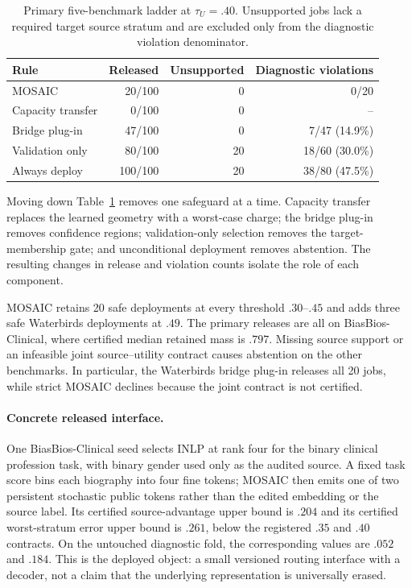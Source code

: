 \begin{table}[t]
\centering
\scriptsize
\setlength{\tabcolsep}{3.4pt}
\begin{tabular}{lrrr}
\hline
Rule & Released & Unsupported & Diagnostic violations \\
\hline
MOSAIC & 20/100 & 0 & 0/20 \\
Capacity transfer & 0/100 & 0 & -- \\
Bridge plug-in & 47/100 & 0 & 7/47 (14.9\%) \\
Validation only & 80/100 & 20 & 18/60 (30.0\%) \\
Always deploy & 100/100 & 20 & 38/80 (47.5\%) \\
\hline
\end{tabular}
\caption{Primary five-benchmark ladder at $\tau_U=.40$. Unsupported jobs lack
a required target source stratum and are excluded only from the diagnostic
violation denominator.}
\label{tab:release-ladder}
\end{table}

Moving down Table~\ref{tab:release-ladder} removes one safeguard at a time.
Capacity transfer replaces the learned geometry with a worst-case charge; the
bridge plug-in removes confidence regions; validation-only selection removes
the target-membership gate; and unconditional deployment removes abstention.
The resulting changes in release and violation counts isolate the role of each
component.

MOSAIC retains 20 safe deployments at every threshold $.30$--$.45$ and adds
three safe Waterbirds deployments at $.49$. The primary releases are all on
BiasBios-Clinical, where certified median retained mass is $.797$. Missing
source support or an infeasible joint source--utility contract causes
abstention on the other benchmarks. In particular, the Waterbirds bridge
plug-in releases all 20 jobs, while strict MOSAIC declines because the joint
contract is not certified.

\paragraph{Concrete released interface.}
One BiasBios-Clinical seed selects INLP at rank four for the binary clinical
profession task, with binary gender used only as the audited source. A fixed
task score bins each biography into four fine tokens; MOSAIC then emits one of
two persistent stochastic public tokens rather than the edited embedding or the
source label. Its certified source-advantage upper bound is $.204$ and its
certified worst-stratum error upper bound is $.261$, below the registered $.35$
and $.40$ contracts. On the untouched diagnostic fold, the corresponding values
are $.052$ and $.184$. This is the deployed object: a small versioned routing
interface with a decoder, not a claim that the underlying representation is
universally erased.

